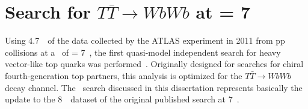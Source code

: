 \clearpage{\pagestyle{empty}\cleardoublepage}

\chapter{Search for $T\bar{T}\to WbWb$ at \rts = 7~\tev}\label{app:wbx7tev}

Using 4.7~\ifb\ of the data collected by the ATLAS experiment
in 2011 from pp collisions at a \cme\ of \rts = 7~\tev,
the first quasi-model independent search for heavy vector-like
top quarks was performed~\cite{ATLAS:2012qe}. Originally designed for searches
for chiral fourth-generation top partners, this 
analysis is optimized for the $T\bar{T}\to WbWb$ 
decay channel.
The \wbx\ search discussed in this dissertation 
represents basically the update to the 8~\tev\ dataset
of the original published search at  7~\tev.

